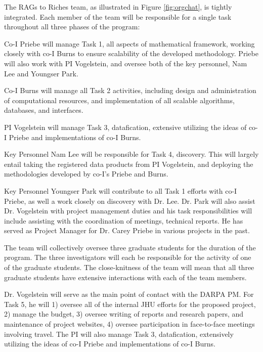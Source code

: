 The RAGs to Riches team, as illustrated in Figure \ref{fig:orgchat}, is tightly integrated.  Each member of the team will be responsible for a single task throughout all three phases of the program:
\begin{compactenum}
\item Co-I Priebe will manage Task 1, all aspects of mathematical framework, working closely with co-I Burns to ensure scalability of the developed methodology. Priebe will also work with PI Vogelstein, and oversee both of the key personnel, Nam Lee and Youngser Park.
\item Co-I Burns will manage all Task 2 activities, including design and administration of computational resources, and implementation of all scalable algorithms, databases, and interfaces.
\item PI Vogelstein will manage Task 3, datafication, extensive utilizing the ideas of co-I Priebe and implementations of co-I Burns.  
\item Key Personnel Nam Lee will be responsible for Task 4, discovery.  This will largely entail taking the registered data products from PI Vogelstein, and deploying the methodologies developed by co-I's Priebe and Burns.
\item Key Personnel Youngser Park will contribute to all Task 1 efforts with co-I Priebe, as well a work closely on discovery with Dr. Lee.  Dr. Park will also assist Dr. Vogelstein with project management duties and his task responsibilities will include assisting with the coordination of meetings, technical reports.  He has served as Project Manager for Dr. Carey Priebe in various projects in the past.
\end{compactenum}

The team will collectively oversee three graduate students for the duration of the program.  The three investigators will each be responsible for the activity of one of the graduate students.  The close-knitness of the team will mean that all three graduate students have extensive interactions with each of the team members.

Dr. Vogelstein will serve as the main point of contact with the DARPA PM.  For Task 5, he will  1) oversee all of the internal JHU efforts for the proposed project, 2) manage the budget, 3) oversee writing of reports and research papers, and maintenance of project websites, 4) oversee participation in face-to-face meetings involving travel.  The PI will also manage Task 3, datafication, extensively utilizing the ideas of co-I Priebe and implementations of co-I Burns.

